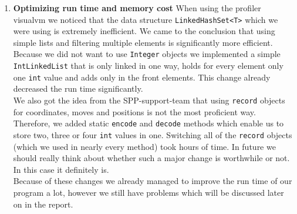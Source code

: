 \begin{enumerate}
        \begin{lstlisting}
        return score > 1 ? score * (-1) + 1 : score - 1;
        \end{lstlisting}
        \noindent Another update was made to the \textit{evaluate()} method, which now multiplies each heuristic by a weight, sums the results, and returns an \textit{int} value between 0 and 1000.
    \item \textbf{Optimizing run time and memory cost}
        When using the profiler visualvm we noticed that the data structure \texttt{LinkedHashSet<T>} which we were using is extremely inefficient. We came to the conclusion that using simple lists and filtering multiple elements is significantly more efficient. Because we did not want to use \texttt{Integer} objects we implemented a simple \texttt{IntLinkedList} that is only linked in one way, holds for every element only one \texttt{int} value and adds only in the front elements. This change already decreased the run time significantly.\\
        \noindent We also got the idea from the SPP-support-team that using \texttt{record} objects for coordinates, moves and positions is not the most proficient way. Therefore, we added static \texttt{encode} and \texttt{decode} methods which enable us to store two, three or four \texttt{int} values in one. Switching all of the \texttt{record} objects (which we used in nearly every method) took hours of time. In future we should really think about whether such a major change is worthwhile or not. In this case it definitely is.\\
        Because of these changes we already managed to improve the run time of our program a lot, however we still have problems which will be discussed later on in the report.
\end{enumerate}

